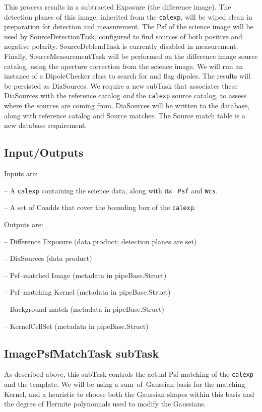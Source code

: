 \documentclass[12pt]{article}
\begin{document}
This process results in a subtracted Exposure (the difference image).
The detection planes of this image, inherited from the {\tt calexp},
will be wiped clean in preparation for detection and measurement.  The
Psf of the science image will be used by SourceDetectionTask,
configured to find sources of both positive and negative polarity.
SourceDeblendTask is currently disabled in measurement.  Finally,
SourceMeasurementTask will be performed on the difference image source
catalog, using the aperture correction from the science image.  We
will run an instance of a DipoleChecker class to search for and flag
dipoles.  The results will be persisted as DiaSources.  We require a
new subTask that associates these DiaSources with the reference
catalog {\it and} the {\tt calexp} source catalog, to assess where the
sources are coming from.  DiaSources will be written to the database,
along with reference catalog and Source matches.  The Source match
table is a new database requirement.

\subsection{Input/Outputs}

Inputs are:

-- A {\tt calexp} containing the science data, along with its {\tt
  Psf} and {\tt Wcs}.

-- A set of Coadds that cover the bounding box of the {\tt calexp}.

Outputs are:

-- Difference Exposure (data product; detection planes are set)

-- DiaSources (data product)

-- Psf--matched Image (metadata in pipeBase.Struct)

-- Psf--matching Kernel (metadata in pipeBase.Struct)

-- Background match (metadata in pipeBase.Struct)

-- KernelCellSet (metadata in pipeBase.Struct)

\subsection{ImagePsfMatchTask subTask}
As described above, this subTask controls the actual Psf-matching of
the {\tt calexp} and the template.  We will be using a
sum--of--Gaussian basis for the matching Kernel, and a heuristic to
choose both the Gaussian shapes within this basis and the degree of
Hermite polynomials used to modify the Gaussians.
\end{document}

